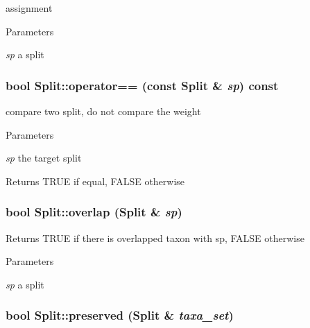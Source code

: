\label{classSplit_ab8d66a1714b54f7e1a1a0c714b2e1175}
assignment 
\begin{DoxyParams}{Parameters}
\item[{\em sp}]a split \end{DoxyParams}
\hypertarget{classSplit_ad74cb390339b148f3bc45e3e4db8ac58}{
\subsubsection[{operator==}]{\setlength{\rightskip}{0pt plus 5cm}bool Split::operator== (const {\bf Split} \& {\em sp}) const}}
\label{classSplit_ad74cb390339b148f3bc45e3e4db8ac58}
compare two split, do not compare the weight 
\begin{DoxyParams}{Parameters}
\item[{\em sp}]the target split \end{DoxyParams}
\begin{DoxyReturn}{Returns}
TRUE if equal, FALSE otherwise 
\end{DoxyReturn}
\hypertarget{classSplit_a50109c1755bdaa7143295515bcd5be44}{
\subsubsection[{overlap}]{\setlength{\rightskip}{0pt plus 5cm}bool Split::overlap ({\bf Split} \& {\em sp})}}
\label{classSplit_a50109c1755bdaa7143295515bcd5be44}
\begin{DoxyReturn}{Returns}
TRUE if there is overlapped taxon with sp, FALSE otherwise 
\end{DoxyReturn}

\begin{DoxyParams}{Parameters}
\item[{\em sp}]a split \end{DoxyParams}
\hypertarget{classSplit_a164299ace7e47de37ebe8f9daeda8fc8}{
\subsubsection[{preserved}]{\setlength{\rightskip}{0pt plus 5cm}bool Split::preserved ({\bf Split} \& {\em taxa\_\-set})}}
\label{classSplit_a164299ace7e47de37ebe8f9daeda8fc8}

